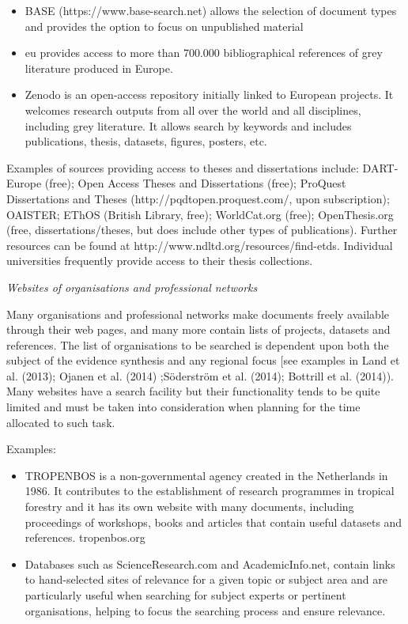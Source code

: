 \documentclass[
  letterpaper,
  DIV=11,
  numbers=noendperiod]{scrreprt}
\begin{document}
\begin{itemize}
\item
  BASE (https://www.base-search.net) allows the selection of document
  types and provides the option to focus on unpublished material
\item
  eu provides access to more than 700.000 bibliographical references of
  grey literature produced in Europe.
\item
  Zenodo is an open-access repository initially linked to European
  projects. It welcomes research outputs from all over the world and all
  disciplines, including grey literature. It allows search by keywords
  and includes publications, thesis, datasets, figures, posters, etc.
\end{itemize}

Examples of sources providing access to theses and dissertations
include: DART-Europe (free); Open Access Theses and Dissertations
(free); ProQuest Dissertations and Theses
(http://pqdtopen.proquest.com/, upon subscription); OAISTER; EThOS
(British Library, free); WorldCat.org (free); OpenThesis.org (free,
dissertations/theses, but does include other types of publications).
Further resources can be found at
http://www.ndltd.org/resources/find-etds. Individual universities
frequently provide access to their thesis collections.

\emph{Websites of organisations and professional networks}

Many organisations and professional networks make documents freely
available through their web pages, and many more contain lists of
projects, datasets and references. The list of organisations to be
searched is dependent upon both the subject of the evidence synthesis
and any regional focus {[}see examples in Land et al. (2013); Ojanen et
al. (2014) ;Söderström et al. (2014); Bottrill et al. (2014)). Many
websites have a search facility but their functionality tends to be
quite limited and must be taken into consideration when planning for the
time allocated to such task.

Examples:

\begin{itemize}
\item
  TROPENBOS is a non-governmental agency created in the Netherlands in
  1986. It contributes to the establishment of research programmes in
  tropical forestry and it has its own website with many documents,
  including proceedings of workshops, books and articles that contain
  useful datasets and references. tropenbos.org
\item
  Databases such as ScienceResearch.com and AcademicInfo.net, contain
  links to hand-selected sites of relevance for a given topic or subject
  area and are particularly useful when searching for subject experts or
  pertinent organisations, helping to focus the searching process and
  ensure relevance.
\end{itemize}
\end{document}
